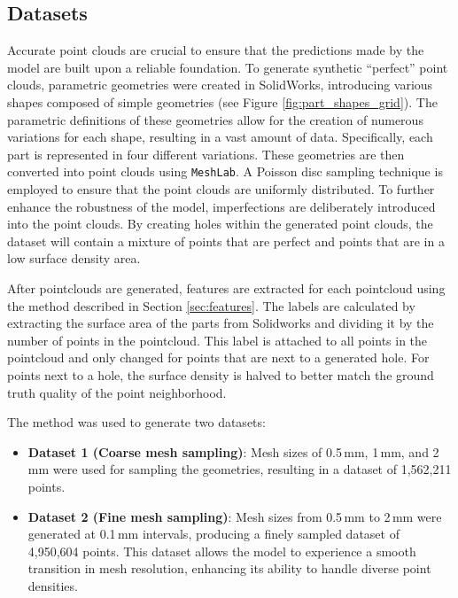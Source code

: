 \subsection{Datasets}
Accurate point clouds are crucial to ensure that the predictions made by the model are built upon a reliable foundation. To generate synthetic “perfect” point clouds, parametric geometries were created in SolidWorks, introducing various shapes composed of simple geometries (see Figure \ref{fig:part_shapes_grid}). The parametric definitions of these geometries allow for the creation of numerous variations for each shape, resulting in a vast amount of data. Specifically, each part is represented in four different variations. These geometries are then converted into point clouds using \texttt{MeshLab}. A Poisson disc sampling technique is employed to ensure that the point clouds are uniformly distributed. To further enhance the robustness of the model, imperfections are deliberately introduced into the point clouds. By creating holes within the generated point clouds, the dataset will contain a mixture of points that are perfect and points that are in a low surface density area. 

After pointclouds are generated, features are extracted for each pointcloud using the method described in Section \ref{sec:features}. The labels are calculated by extracting the surface area of the parts from Solidworks and dividing it by the number of points in the pointcloud. This label is attached to all points in the pointcloud and only changed for points that are next to a generated hole. For points next to a hole, the surface density is halved to better match the ground truth quality of the point neighborhood.

The method was used to generate two datasets:
\begin{itemize}
    \item \textbf{Dataset 1 (Coarse mesh sampling)}: Mesh sizes of 0.5\,mm, 1\,mm, and 2\,mm were used for sampling the geometries, resulting in a dataset of 1,562,211 points.
    
    \item \textbf{Dataset 2 (Fine mesh sampling)}: Mesh sizes from 0.5\,mm to 2\,mm were generated at 0.1\,mm intervals, producing a finely sampled dataset of 4,950,604 points. This dataset allows the model to experience a smooth transition in mesh resolution, enhancing its ability to handle diverse point densities.
\end{itemize}



